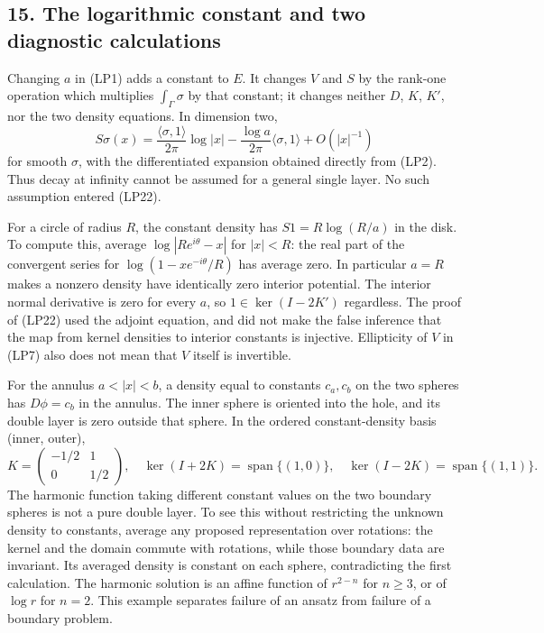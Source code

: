 \documentclass[
  11pt,
]{article}
\begin{document}
\subsection{15. The logarithmic constant and two diagnostic
calculations}\label{the-logarithmic-constant-and-two-diagnostic-calculations}

Changing \(a\) in (LP1) adds a constant to \(E\). It changes \(V\) and
\(S\) by the rank-one operation which multiplies \(\int_\Gamma\sigma\)
by that constant; it changes neither \(D\), \(K\), \(K'\), nor the two
density equations. In dimension two, \[
 S\sigma(x)=\frac{\langle\sigma,1\rangle}{2\pi}\log|x|
       -\frac{\log a}{2\pi}\langle\sigma,1\rangle+O(|x|^{-1})
 \tag{LP25}
\] for smooth \(\sigma\), with the differentiated expansion obtained
directly from (LP2). Thus decay at infinity cannot be assumed for a
general single layer. No such assumption entered (LP22).

For a circle of radius \(R\), the constant density has \(S1=R\log(R/a)\)
in the disk. To compute this, average \(\log|Re^{i\theta}-x|\) for
\(|x|<R\): the real part of the convergent series for
\(\log(1-xe^{-i\theta}/R)\) has average zero. In particular \(a=R\)
makes a nonzero density have identically zero interior potential. The
interior normal derivative is zero for every \(a\), so
\(1\in\ker(I-2K')\) regardless. The proof of (LP22) used the adjoint
equation, and did not make the false inference that the map from kernel
densities to interior constants is injective. Ellipticity of \(V\) in
(LP7) also does not mean that \(V\) itself is invertible.

For the annulus \(a<|x|<b\), a density equal to constants \(c_a,c_b\) on
the two spheres has \(D\phi=c_b\) in the annulus. The inner sphere is
oriented into the hole, and its double layer is zero outside that
sphere. In the ordered constant-density basis (inner, outer), \[
 K=\begin{pmatrix}-1/2&1\\0&1/2\end{pmatrix},\quad
 \ker(I+2K)=\operatorname{span}\{(1,0)\},\quad
 \ker(I-2K)=\operatorname{span}\{(1,1)\}.
 \tag{LP26}
\] The harmonic function taking different constant values on the two
boundary spheres is not a pure double layer. To see this without
restricting the unknown density to constants, average any proposed
representation over rotations: the kernel and the domain commute with
rotations, while those boundary data are invariant. Its averaged density
is constant on each sphere, contradicting the first calculation. The
harmonic solution is an affine function of \(r^{2-n}\) for \(n\ge3\), or
of \(\log r\) for \(n=2\). This example separates failure of an ansatz
from failure of a boundary problem.
\end{document}
